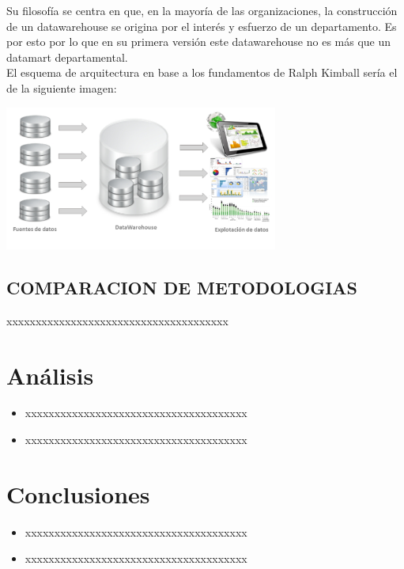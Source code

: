 \documentclass[%
 reprint,
 amsmath,amssymb,
 aps,
]{revtex4-1}
\begin{document}
Su filosofía se centra en que, en la mayoría de las organizaciones, la construcción de un datawarehouse se origina por el interés y esfuerzo de un departamento. Es por esto por lo que en su primera versión este datawarehouse no es más que un datamart departamental.\\

El esquema de arquitectura en base a los fundamentos de Ralph Kimball sería el de la siguiente imagen:

     				\begin{center}
					\includegraphics[width=9cm]{./IMAGENES/arquitectura}
				\end{center}

 


\subsection{COMPARACION DE METODOLOGIAS}	
xxxxxxxxxxxxxxxxxxxxxxxxxxxxxxxxxxxxxx

\section{Análisis}

\begin{itemize}
\item xxxxxxxxxxxxxxxxxxxxxxxxxxxxxxxxxxxxxx 
\item xxxxxxxxxxxxxxxxxxxxxxxxxxxxxxxxxxxxxx 
\end{itemize}
\section{Conclusiones}

\begin{itemize}
\item xxxxxxxxxxxxxxxxxxxxxxxxxxxxxxxxxxxxxx 
\item xxxxxxxxxxxxxxxxxxxxxxxxxxxxxxxxxxxxxx 

\end{itemize}






\end{document}

